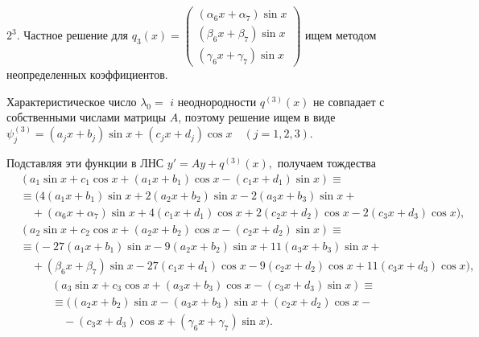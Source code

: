 \documentclass[11pt]{article}
\begin{document}
{%


\smallskip
$2^3.$ Частное решение для $q_3(x) = \begin{pmatrix} (\alpha_6 x + \alpha_7) \sin x \\ (\beta_6 x + \beta_7) \sin x \\ (\gamma_6 x + \gamma_7) \sin x \end{pmatrix}$ ищем методом неопределенных коэффициентов.

Характеристическое число $\lambda_0=$ $i$ неоднородности $q^{(3)}(x)$ не совпадает с собственными числами матрицы $A$, поэтому решение ищем в виде \\ $\psi_j^{(3)} = (a_j x + b_j) \sin x + (c_j x + d_j) \cos x \quad (j=1,2,3).$

Подставляя эти функции в ЛНС $y'=Ay+q^{(3)}(x),$ получаем тождества
\begin{align*}
&(a_1 \sin x + c_1 \cos x + (a_1 x + b_1)\cos x - (c_1 x + d_1)\sin x)\equiv \\
&\equiv \big(4(a_1 x + b_1)\sin x + 2(a_2 x + b_2)\sin x - 2(a_3 x + b_3)\sin x+ \\
&\quad + (\alpha_6 x + \alpha_7)\sin x + 4(c_1 x + d_1)\cos x + 2(c_2 x + d_2)\cos x - 2(c_3 x + d_3)\cos x\big),
\end{align*}
\vspace{-2em}
\begin{align*}
&(a_2 \sin x + c_2 \cos x + (a_2 x + b_2)\cos x - (c_2 x + d_2)\sin x)\equiv \\
&\equiv \big(-27(a_1 x + b_1)\sin x - 9(a_2 x + b_2)\sin x + 11(a_3 x + b_3)\sin x+ \\
&\quad + (\beta_6 x + \beta_7)\sin x - 27(c_1 x + d_1)\cos x - 9(c_2 x + d_2)\cos x+ 11(c_3 x + d_3)\cos x\big),
\end{align*}
\vspace{-2em}
\begin{align*}
&(a_3 \sin x + c_3 \cos x + (a_3 x + b_3)\cos x - (c_3 x + d_3)\sin x)\equiv \\
&\equiv \big((a_2 x + b_2)\sin x - (a_3 x + b_3)\sin x + (c_2 x + d_2)\cos x- \\
&\quad - (c_3 x + d_3)\cos x + (\gamma_6 x + \gamma_7)\sin x\big).
\end{align*}

}
\end{document}
